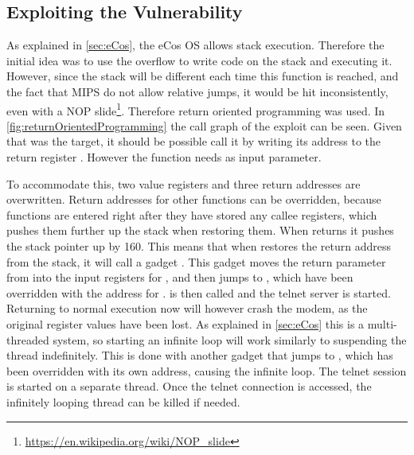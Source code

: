 \subsection{Exploiting the Vulnerability}
\label{subsec:exploitingTheVulneruablity}
As explained in \cref{sec:eCos}, the eCos OS allows stack execution. Therefore the initial idea was to use the overflow to write code on the stack and executing it.
However, since the stack will be different each time this function is reached, and the fact that MIPS do not allow relative jumps, it would be hit inconsistently, even with a NOP slide\footnote{\url{https://en.wikipedia.org/wiki/NOP_slide}}.
Therefore return oriented programming was used.
In \cref{fig:returnOrientedProgramming} the call graph of the exploit can be seen.
Given that  was the target, it should be possible call it by writing its address to the return register .
However the function needs  as input parameter.

To accommodate this, two value registers and three return addresses are overwritten.
Return addresses for other functions can be overridden, because functions are entered right after they have stored any callee registers, which pushes them further up the stack when restoring them.
When  returns it pushes the stack pointer up by 160.
This means that when  restores the return address from the stack, it will call a gadget .
This gadget moves the return parameter from  into the input registers for , and then jumps to , which have been overridden with the address for .
 is then called and the telnet server is started.
Returning to normal execution now will however crash the modem, as the original register values have been lost. As explained in \cref{sec:eCos} this is a multi-threaded system, so starting an infinite loop will work similarly to suspending the thread indefinitely.
This is done with another gadget that jumps to , which has been overridden with its own address, causing the infinite loop. The telnet session is started on a separate thread.
Once the telnet connection is accessed, the infinitely looping thread can be killed if needed.

